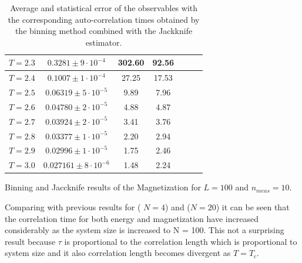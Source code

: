 \documentclass[article]{revtex4}
\begin{document}
\begin{table}[h!]
\begin{subtable}{.5\textwidth}
\begin{tabular}{|c|c|c|c|c|c|c|}
\hline
$T = 2.3$ &$0.3281 \pm 9 \cdot10^{-4}$&302.60&92.56\\
\hline
$T = 2.4$ &$0.1007 \pm 1 \cdot10^{-4}$&27.25&17.53\\
\hline
$T = 2.5$ &$0.06319 \pm 5 \cdot10^{-5}$&9.89&7.96\\
\hline
$T = 2.6$ &$0.04780 \pm 2 \cdot10^{-5}$&4.88&4.87\\
\hline
$T = 2.7$ &$0.03924 \pm 2 \cdot10^{-5}$&3.41&3.76\\
\hline
$T = 2.8$ &$0.03377 \pm 1 \cdot10^{-5}$&2.20&2.94\\
\hline
$T = 2.9$ &$0.02996 \pm 1 \cdot10^{-5}$&1.75&2.46\\
\hline
$T = 3.0$&$0.027161 \pm 8 \cdot10^{-6}$&1.48&2.24\\
\hline
\end{tabular}
\caption{Binning and Jaccknife results of the Magnetization for $L = 100$ and $n_{meas}=10$.}
\end{subtable}
\caption{Average and statistical error of the observables with the corresponding auto-correlation times obtained by the binning method combined with the Jackknife estimator.}
\end{table}

Comparing with previous results for ( $N = 4$) and ($N = 20$) it can be seen that the correlation time for both energy and magnetization have increased considerably as the system size is increased to N = 100. This not a surprising result because $\tau$ is proportional to the correlation length which is proportional to system size and it also correlation length becomes divergent as $T=T_c$.
\\
\end{document}
